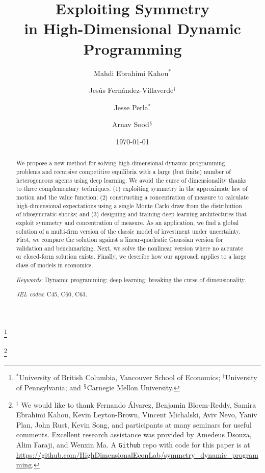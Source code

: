\documentclass[12pt]{article}
\newcommand\blfootnote[1]{%
	\begingroup
	\renewcommand\thefootnote{}\footnote{#1}%
	\addtocounter{footnote}{-1}%
	\endgroup
}
\begin{document}
\title{Exploiting Symmetry \\ \vspace{0.1in}
in High-Dimensional Dynamic Programming}	
\author{\small Mahdi Ebrahimi Kahou$^{*}$\and \small Jes\'{u}s Fern\'{a}ndez-Villaverde$^{\dagger}$\and \small Jesse Perla$^{*}$ \and\small  Arnav Sood$^{\mathsection}$}
\date{\today}
\maketitle\blfootnote{$^{*}$University of British Columbia, Vancouver School of Economics; ${}^{\dagger}$University of Pennsylvania; and ${}^{\mathsection}$Carnegie Mellon University.}\blfootnote{$^{\ddagger}$ We would like to thank Fernando \'Alvarez, Benjamin Bloem-Reddy, Samira Ebrahimi Kahou, Kevin Leyton-Brown, Vincent Michalski,  Aviv Nevo, Yaniv Plan, John Rust, Kevin Song, and participants at many seminars for useful comments. Excellent research assistance was provided by Amedeus Dsouza, Alim Faraji, and Wenxin Ma. A \texttt{Github} repo with code for this paper is at \url{https://github.com/HighDimensionalEconLab/symmetry_dynamic_programming}.}

\begin{abstract}
\noindent
We propose a new method for solving high-dimensional dynamic programming problems and recursive competitive equilibria with a large (but finite) number of heterogeneous agents using deep learning. We avoid the curse of dimensionality thanks to three complementary techniques: (1) exploiting symmetry in the approximate law of motion and the value function; (2) constructing a concentration of measure to calculate high-dimensional expectations using a single Monte Carlo draw from the distribution of idiosyncratic shocks; and (3) designing and training deep learning architectures that exploit symmetry and concentration of measure. As an application, we find a global solution of a multi-firm version of the classic \citet{LucasPrescott1971} model of investment under uncertainty. First, we compare the solution against a linear-quadratic Gaussian version for validation and benchmarking. Next, we solve the nonlinear version where no accurate or closed-form solution exists. Finally, we describe how our approach applies to a large class of models in economics.

\textit{Keywords}{\small: Dynamic programming; deep learning; breaking the curse of dimensionality.}

\textit{JEL codes}{\small: C45, C60, C63.}

\end{abstract}
\end{document}
